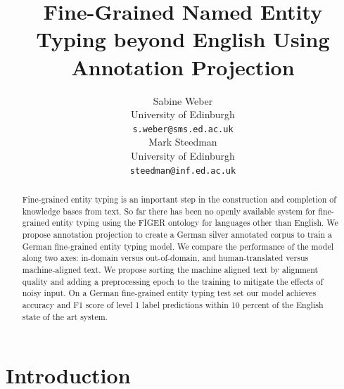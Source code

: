 \documentclass[11pt,a4paper]{article}
\title{Fine-Grained Named Entity Typing beyond English Using Annotation Projection}
\author{Sabine Weber \\
  University of Edinburgh \\
  \texttt{s.weber@sms.ed.ac.uk} \\\And
  Mark Steedman \\
  University of Edinburgh \\
  \texttt{steedman@inf.ed.ac.uk} \\}
\date{}
\begin{document}
\maketitle
\begin{abstract}
Fine-grained entity typing is an important step in the construction and completion of knowledge bases from text. So far there has been no openly available system for fine-grained entity typing using the FIGER ontology \cite{ling2012fine} for languages other than English. We propose annotation projection to create a German silver annotated corpus to train a German fine-grained entity typing model. We compare the performance of the model along two axes: in-domain versus out-of-domain, and human-translated versus machine-aligned text. We propose sorting the machine aligned text by alignment quality and adding a preprocessing epoch to the training to mitigate the effects of noisy input. On a German fine-grained entity typing test set our model achieves accuracy and F1 score of level 1 label predictions within 10 percent of the English state of the art system.\end{abstract}

\section{Introduction}



\end{document}
